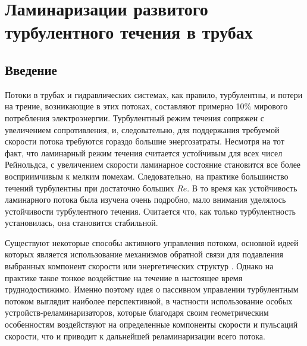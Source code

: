 \chapter{Ламинаризации развитого турбулентного течения в трубах}\label{ch:ch3}
%
\section{Введение}\label{ch3:intro}
%
Потоки в трубах и гидравлических системах, как правило, турбулентны, и потери на трение, 
возникающие в этих потоках, составляют примерно 10\% мирового потребления электроэнергии. 
%
Турбулентный режим течения сопряжен с увеличением сопротивления, и, следовательно, 
для поддержания требуемой скорости потока требуются гораздо большие энергозатраты. 
%
Несмотря на тот факт, что ламинарный режим течения считается устойчивым для всех чисел Рейнольдса, 
с увеличением скорости ламинарное состояние становится все более восприимчивым к мелким помехам. 
%
Следовательно, на практике большинство течений турбулентны при достаточно больших $Re$. 
%
В то время как устойчивость ламинарного потока была изучена очень подробно, 
мало внимания уделялось устойчивости турбулентного течения. 
%
Считается что, как только турбулентность установилась, она становится стабильной.
%


Существуют некоторые способы активного управления потоком, основной идеей которых 
является использование механизмов обратной связи для подавления выбранных компонент 
скорости или энергетических структур \cite{kuhnen2018destabilizing,kuhnen2019relaminarization}. 
%
Однако на практике такое тонкое воздействие на течение в настоящее время труднодостижимо. 
%
Именно поэтому идея о пассивном управлении турбулентным потоком выглядит наиболее перспективной, 
в частности использование особых устройств-реламинаризаторов, которые благодаря своим геометрическим 
особенностям воздействуют на определенные компоненты скорости и пульсаций скорости, 
что и приводит к дальнейшей реламинаризации всего потока.


